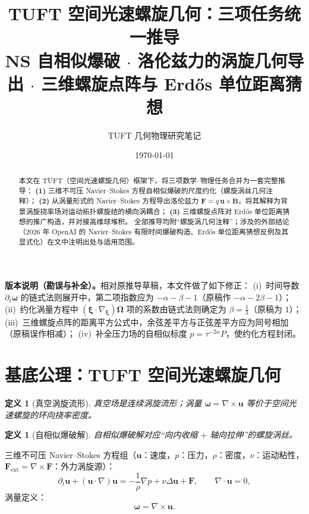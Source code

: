 \documentclass[11pt,a4paper]{article}
\title{\bfseries TUFT 空间光速螺旋几何：三项任务统一推导\\[4pt]
\large NS 自相似爆破 $\cdot$ 洛伦兹力的涡旋几何导出 $\cdot$ 三维螺旋点阵与 Erd\H{o}s 单位距离猜想}
\author{TUFT 几何物理研究笔记}
\date{\today}
\newcommand{\bxi}{\bm{\xi}}
\newcommand{\bu}{\bm{u}}
\newcommand{\bom}{\bm{\omega}}
\newcommand{\bOm}{\bm{\Omega}}
\newcommand{\bF}{\bm{F}}
\newcommand{\bB}{\bm{B}}
\newtheorem{definition}[theorem]{定义}
\theoremstyle{remark}
\begin{document}
\maketitle

\begin{abstract}
本文在 TUFT（空间光速螺旋几何）框架下，将三项数学--物理任务合并为一套完整推导：
\textbf{(1)} 三维不可压 Navier--Stokes 方程自相似爆破的尺度约化（螺旋涡丝几何注释）；
\textbf{(2)} 从涡量形式的 Navier--Stokes 方程导出洛伦兹力 $\bF=q\,\bu\times\bB$，将其解释为背景涡旋挠率场对运动拓扑螺旋结的横向涡耦合；
\textbf{(3)} 三维螺旋点阵对 Erd\H{o}s 单位距离猜想的推广构造，并对接高维球堆积。
全部推导均附“螺旋涡几何注释”；涉及的外部结论（2026 年 OpenAI 的 Navier--Stokes 有限时间爆破构造、Erd\H{o}s 单位距离猜想反例及其显式化）在文中注明出处与适用范围。
\end{abstract}

\noindent\textbf{版本说明（勘误与补全）。}相对原推导草稿，本文件做了如下修正：
(i)~时间导数 $\partial_t\bom$ 的链式法则展开中，第二项指数应为 $-\alpha-\beta-1$（原稿作 $-\alpha-2\beta-1$）；
(ii)~约化涡量方程中 $(\bxi\cdot\nabla_{\bxi})\bOm$ 项的系数由链式法则确定为 $\beta=\frac13$（原稿为 $1$）；
(iii)~三维螺旋点阵的距离平方公式中，余弦差平方与正弦差平方应为同号相加（原稿误作相减）；
(iv)~补全压力场的自相似标度 $p=\tau^{-2\alpha}P$，使约化方程封闭。

\tableofcontents

\section{基底公理：TUFT 空间光速螺旋几何}

\begin{definition}[真空涡旋流形]
真空场是连续涡旋流形；涡量 $\bom=\nabla\times\bu$ 等价于空间光速螺旋的环向挠率密度。
\end{definition}

\begin{definition}[自相似爆破解]
自相似爆破解对应“向内收缩 $+$ 轴向拉伸”的螺旋涡丝。
\end{definition}

三维不可压 Navier--Stokes 方程组（$\bu$：速度，$p$：压力，$\rho$：密度，$\nu$：运动粘性，$\bF_{\mathrm{ext}}=\nabla\times\bF$：外力涡旋源）：
\begin{equation}
\label{eq:ns}
\partial_t\bu+(\bu\cdot\nabla)\bu=-\frac1\rho\nabla p+\nu\Delta\bu+\bF,\qquad
\nabla\cdot\bu=0,
\end{equation}
涡量定义：
\begin{equation}
\label{eq:vortdef}
\bom=\nabla\times\bu.
\end{equation}
\end{document}
